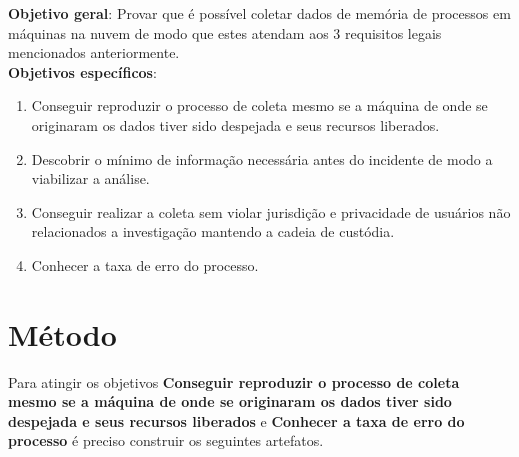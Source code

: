 \documentclass[12pt,				%
	openright,			%
	oneside,			%
	a4paper,			%
	english,			%
	brazil				%
	]{abntex2}
\begin{document}
\noindent \textbf{Objetivo geral}: Provar que é possível coletar dados de memória de processos em máquinas na nuvem de modo que estes atendam
aos 3 requisitos legais mencionados anteriormente. \\

\noindent \textbf{Objetivos específicos}:
\begin{enumerate}
 \item Conseguir reproduzir o processo de coleta mesmo se a máquina de onde se originaram os dados tiver sido despejada e seus recursos liberados.
 \item Descobrir o mínimo de informação necessária antes do incidente de modo a viabilizar a análise.
 \item Conseguir realizar a coleta sem violar jurisdição e privacidade de usuários não relacionados a investigação mantendo a cadeia de custódia.
 \item Conhecer a taxa de erro do processo.
\end{enumerate}

\chapter{Método} \label{chap:metodo}

Para atingir os objetivos \textbf{Conseguir reproduzir o processo de coleta mesmo se a máquina de onde se originaram os dados tiver sido despejada e seus recursos 
liberados} e \textbf{Conhecer a taxa de erro do processo} é preciso construir os seguintes artefatos.
\end{document}
